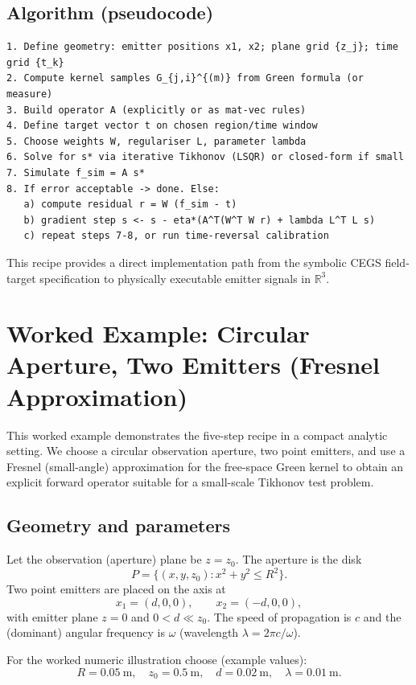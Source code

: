 \documentclass[11pt]{article}
\theoremstyle{plain}
\theoremstyle{definition}
\theoremstyle{remark}
\begin{document}
\subsection*{Algorithm (pseudocode)}
\begin{verbatim}
1. Define geometry: emitter positions x1, x2; plane grid {z_j}; time grid {t_k}
2. Compute kernel samples G_{j,i}^{(m)} from Green formula (or measure)
3. Build operator A (explicitly or as mat-vec rules)
4. Define target vector t on chosen region/time window
5. Choose weights W, regulariser L, parameter lambda
6. Solve for s* via iterative Tikhonov (LSQR) or closed-form if small
7. Simulate f_sim = A s*
8. If error acceptable -> done. Else:
   a) compute residual r = W (f_sim - t)
   b) gradient step s <- s - eta*(A^T(W^T W r) + lambda L^T L s)
   c) repeat steps 7-8, or run time-reversal calibration
\end{verbatim}

\noindent This recipe provides a direct implementation path from the symbolic CEGS
field-target specification to physically executable emitter signals in $\mathbb{R}^3$.


\section*{Worked Example: Circular Aperture, Two Emitters (Fresnel Approximation)}

This worked example demonstrates the five-step recipe in a compact analytic setting.
We choose a circular observation aperture, two point emitters, and use a Fresnel
(small-angle) approximation for the free-space Green kernel to obtain an explicit
forward operator suitable for a small-scale Tikhonov test problem.

\subsection*{Geometry and parameters}
Let the observation (aperture) plane be \(z=z_0\). The aperture is the disk
\[
P=\{(x,y,z_0): x^2+y^2\le R^2\}.
\]
Two point emitters are placed on the axis at
\[
x_1=(d,0,0),\qquad x_2=(-d,0,0),
\]
with emitter plane \(z=0\) and \(0<d\ll z_0\). The speed of propagation is \(c\)
and the (dominant) angular frequency is \(\omega\) (wavelength \(\lambda=2\pi c/\omega\)).

For the worked numeric illustration choose (example values):
\[
R = 0.05\ \text{m},\quad z_0 = 0.5\ \text{m},\quad d = 0.02\ \text{m},\quad
\lambda = 0.01\ \text{m}.
\]
\end{document}
